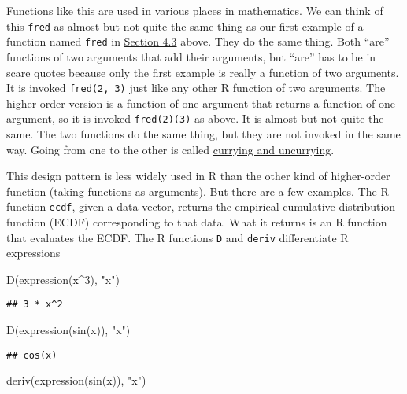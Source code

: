 \documentclass[
]{article}
\newenvironment{Shaded}{\begin{snugshade}}{\end{snugshade}}
\newcommand{\DecValTok}[1]{\textcolor[rgb]{0.00,0.00,0.81}{#1}}
\newcommand{\FunctionTok}[1]{\textcolor[rgb]{0.00,0.00,0.00}{#1}}
\newcommand{\NormalTok}[1]{#1}
\newcommand{\SpecialCharTok}[1]{\textcolor[rgb]{0.00,0.00,0.00}{#1}}
\newcommand{\StringTok}[1]{\textcolor[rgb]{0.31,0.60,0.02}{#1}}
\begin{document}
Functions like this are used in various places in mathematics. We can
think of this \texttt{fred} as almost but not quite the same thing as
our first example of a function named \texttt{fred} in
\protect\hyperlink{functions-assigned-names}{Section 4.3} above. They do
the same thing. Both ``are'' functions of two arguments that add their
arguments, but ``are'' has to be in scare quotes because only the first
example is really a function of two arguments. It is invoked
\texttt{fred(2,\ 3)} just like any other R function of two arguments.
The higher-order version is a function of one argument that returns a
function of one argument, so it is invoked \texttt{fred(2)(3)} as above.
It is almost but not quite the same. The two functions do the same
thing, but they are not invoked in the same way. Going from one to the
other is called \href{https://en.wikipedia.org/wiki/Currying}{currying
and uncurrying}.

This design pattern is less widely used in R than the other kind of
higher-order function (taking functions as arguments). But there are a
few examples. The R function \texttt{ecdf}, given a data vector, returns
the empirical cumulative distribution function (ECDF) corresponding to
that data. What it returns is an R function that evaluates the ECDF. The
R functions \texttt{D} and \texttt{deriv} differentiate R expressions

\begin{Shaded}
\begin{Highlighting}[]
\FunctionTok{D}\NormalTok{(}\FunctionTok{expression}\NormalTok{(x}\SpecialCharTok{\^{}}\DecValTok{3}\NormalTok{), }\StringTok{"x"}\NormalTok{)}
\end{Highlighting}
\end{Shaded}

\begin{verbatim}
## 3 * x^2
\end{verbatim}

\begin{Shaded}
\begin{Highlighting}[]
\FunctionTok{D}\NormalTok{(}\FunctionTok{expression}\NormalTok{(}\FunctionTok{sin}\NormalTok{(x)), }\StringTok{"x"}\NormalTok{)}
\end{Highlighting}
\end{Shaded}

\begin{verbatim}
## cos(x)
\end{verbatim}

\begin{Shaded}
\begin{Highlighting}[]
\FunctionTok{deriv}\NormalTok{(}\FunctionTok{expression}\NormalTok{(}\FunctionTok{sin}\NormalTok{(x)), }\StringTok{"x"}\NormalTok{)}
\end{Highlighting}
\end{Shaded}
\end{document}
